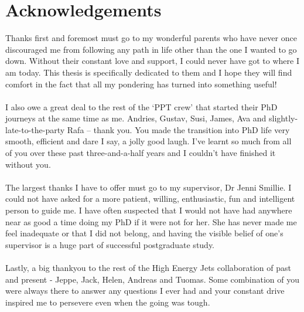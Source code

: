 \chapter{Acknowledgements}

\noindent

\normalsize

Thanks first and foremost must go to my wonderful parents who have never once discouraged me from following any path in life other than the one I wanted to go down. Without their constant love and support, I could never have got to where I am today. This thesis is specifically dedicated to them and I hope they will find comfort in the fact that all my pondering has turned into something useful! \\
\\
I also owe a great deal to the rest of the `PPT crew' that started their PhD journeys at the same time as me. Andries, Gustav, Susi, James, Ava and slightly-late-to-the-party Rafa -- thank you. You made the transition into PhD life very smooth, efficient and dare I say, a jolly good laugh. I've learnt so much from all of you over these past three-and-a-half years and I couldn't have finished it without you. \\
\\
The largest thanks I have to offer must go to my supervisor, Dr Jenni Smillie. I could not have asked for a more patient, willing, enthusiastic, fun and intelligent person to guide me. I have often suspected that I would not have had anywhere near as good a time doing my PhD if it were not for her. She has never made me feel inadequate or that I did not belong, and having the visible belief of one's supervisor is a huge part of successful postgraduate study. \\
\\
Lastly, a big thankyou to the rest of the High Energy Jets collaboration of past and present - Jeppe, Jack, Helen, Andreas and Tuomas. Some combination of you were always there to answer any questions I ever had and your constant drive inspired me to persevere even when the going was tough. 


